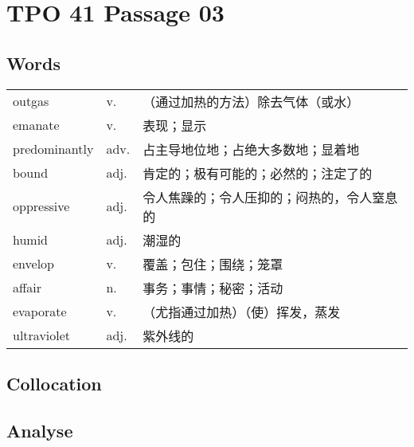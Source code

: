 \section{TPO 41 Passage 03}

\subsection{Words}

\begin{tabular}{lll}
    outgas        & v.   & （通过加热的方法）除去气体（或水）     \\
    emanate       & v.   & 表现；显示                 \\
    predominantly & adv. & 占主导地位地；占绝大多数地；显着地     \\
    bound         & adj. & 肯定的；极有可能的；必然的；注定了的    \\
    oppressive    & adj. & 令人焦躁的；令人压抑的；闷热的，令人窒息的 \\
    humid         & adj. & 潮湿的                   \\
    envelop       & v.   & 覆盖；包住；围绕；笼罩           \\
    affair        & n.   & 事务；事情；秘密；活动           \\
    evaporate     & v.   & （尤指通过加热）（使）挥发，蒸发      \\
    ultraviolet   & adj. & 紫外线的                  \\
\end{tabular}

\subsection{Collocation}

\newpage

\subsection{Analyse}

